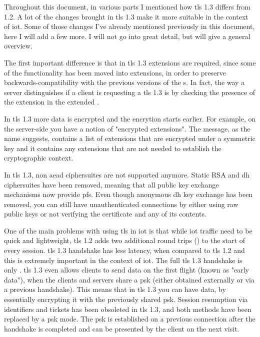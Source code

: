 \documentclass{llncs}
\begin{document}
Throughout this document, in various parts I mentioned how \gls{tls} 1.3 differs from 1.2.
A lot of the changes brought in \gls{tls} 1.3 make it more suitable in the context
of \gls{iot}. Some of those changes I've already mentioned previously in this
document, here I will add a few more. I will not go into great detail, but
will give a general overview.

The first important difference is that in \gls{tls} 1.3 extensions are required,
since some of the functionality has been moved into extensions, in order to preserve
backwards-compatibility with the previous versions of the s.
In fact, the way a server distinguishes if a client is requesting a \gls{tls} 1.3
is by checking the presence of the  extension in the
extended .

In \gls{tls} 1.3 more data is encrypted and the encrytion starts earlier. For example,
on the server-side you have a notion of "encrypted extensions". The 
message, as the name suggests, contains a list of extensions that are encrypted
under a symmetric key and it contains any extensions that are not needed
to establish the cryptographic context.

In \gls{tls} 1.3, non \gls{aead} ciphersuites are not supported anymore.
Static RSA and \gls{dh} ciphersuites have been removed, meaning that all
public key exchange mechanisms now provide \gls{pfs}. Even though
anonymous \gls{dh} key exchange has been removed, you can still have
unauthenticated connections by either using raw public keys or not verifying the
certificate and any of its contents.

One of the main problems with using \gls{tls} in \gls{iot} is that while \gls{iot}
traffic need to be quick and lightweight, \gls{tls} 1.2 adds two additional
round trips () to the start of every session. \gls{tls} 1.3 handshake has less latency,
when compared to \gls{tls} 1.2 and this is extremely important in the context of \gls{iot}.
The full \gls{tls} 1.3 handshake is only . \gls{tls} 1.3 even allows
clients to send data on the first flight (known as "early data"), when the clients
and servers share a \gls{psk} (either obtained externally or via a previous handshake).
This means that in \gls{tls} 1.3 you can have  data, by essentially
encrypting it with the previously shared \gls{psk}. Session resumption
via identifiers and tickets has been obsoleted in \gls{tls} 1.3, and both methods
have been replaced by a \gls{psk} mode. The \gls{psk} is established on a previous
connection after the handshake is completed and can be presented by the client
on the next visit.
\end{document}
